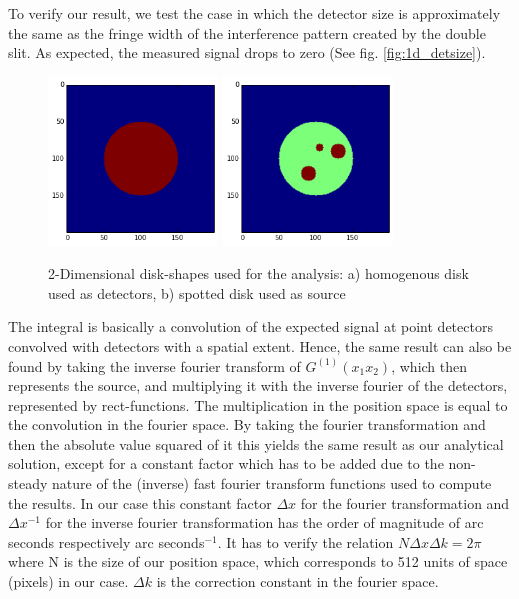 \documentclass{article}
\begin{document}
To verify our result, we test the case in which the detector size is approximately the same as the fringe width of the interference pattern created by the double slit. As expected, the measured signal drops to zero (See fig. \ref{fig:1d_detsize}).
\begin{figure}[ht!]
	\centering
    \includegraphics[width=45mm]{figure_source_homo}
    \includegraphics[width=45mm]{figure_source_rand}
    \caption{2-Dimensional disk-shapes used for the analysis: a) homogenous disk used as detectors, b) spotted disk used as source \label{fig:2d_sources}
 }
\end{figure}
The integral is basically a convolution of the expected signal at point detectors convolved with detectors with a spatial extent. Hence, the same result can also be found by taking the inverse fourier transform of \(G^{(1)}(x_1 x_2)\), which then represents the source, and multiplying it with the inverse fourier of the detectors, represented by rect-functions. The multiplication in the position space is equal to the convolution in the fourier space. By taking the fourier transformation and then the absolute value squared of it this yields the same result as our analytical solution, except for a constant factor which has to be added due to the non-steady nature of the (inverse) fast fourier transform functions used to compute the results. In our case this constant factor $\Delta x$ for the fourier transformation and $\Delta x^{-1}$ for the inverse fourier transformation has the order of magnitude of arc seconds respectively arc seconds$^{-1}$. It has to verify the relation $N\Delta x\Delta k=2\pi$ where N is the size of our position space, which corresponds to 512 units of space (pixels) in our case. $\Delta k$ is the correction constant in the fourier space.
\end{document}
